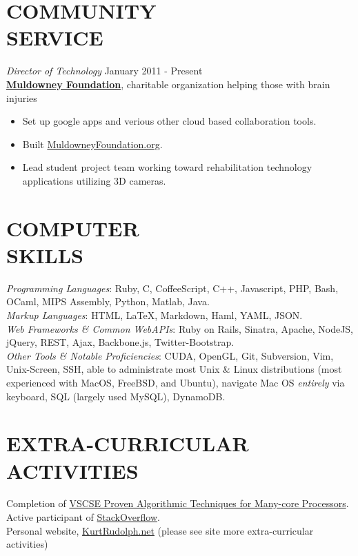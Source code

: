\documentclass[margin]{res}
\begin{document}
\begin{resume}
\section{COMMUNITY \\ SERVICE}  
  {\sl Director of Technology} \hfill January 2011 - Present \\
  {\bf \href{http://www.muldowneyfoundation.org/}{Muldowney Foundation}}, 
    charitable organization helping those with brain injuries
    \begin{itemize}
      \itemsep -2pt %
      \item Set up google apps and verious other cloud based collaboration tools.
      \item Built \href{http://www.muldowneyfoundation.org/}{MuldowneyFoundation.org}.
      \item Lead student project team working toward
          rehabilitation technology applications utilizing 3D cameras.
    \end{itemize}

\section{COMPUTER \\ SKILLS} 
    {\sl Programming Languages}: {\footnotesize Ruby, C, CoffeeScript, C++, 
      Javascript, PHP, Bash, OCaml, MIPS Assembly, Python, Matlab, Java}.\\
    {\sl Markup Languages}: {\footnotesize HTML, \LaTeX, Markdown, Haml, YAML, JSON}.\\
    {\sl Web Frameworks \& Common WebAPIs}: 
      {\footnotesize Ruby on Rails, Sinatra, Apache, NodeJS, jQuery, 
      REST, Ajax, Backbone.js, Twitter-Bootstrap}.\\
    {\sl Other Tools \& Notable Proficiencies}: 
      {\footnotesize CUDA, OpenGL, Git, Subversion, Vim, Unix-Screen, 
      SSH, able to administrate most Unix \& Linux distributions 
      (most experienced with MacOS, FreeBSD, and Ubuntu), navigate
      Mac OS \emph{entirely} via keyboard, SQL (largely used MySQL), DynamoDB}.\\


\section{EXTRA-CURRICULAR \\ ACTIVITIES}             
    Completion of \href{http://www.vscse.org/summerschool/2012/manycore.html}
          {VSCSE Proven Algorithmic Techniques for Many-core Processors}.\\
    Active participant of \href{http://stackoverflow.com/users/1134742/rudolph9}{StackOverflow}.\\
    Personal website, \href{http://kurtrudolph.net/about.html}{KurtRudolph.net} (please see site more extra-curricular activities)\\


\end{resume}
\end{document}

